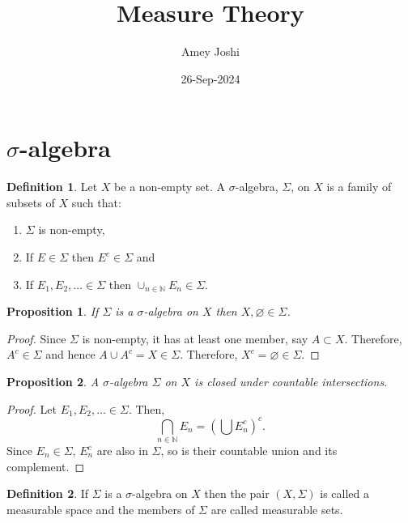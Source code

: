 \documentclass{article}
\title{Measure Theory}
\author{Amey Joshi}
\date{26-Sep-2024}
\theoremstyle{plain}
\numberwithin{thm}{section}
\theoremstyle{plain}
\newtheorem{prop}{Proposition}
\numberwithin{prop}{section}
\theoremstyle{definition}
\newtheorem{defn}{Definition}
\numberwithin{defn}{section}
\theoremstyle{remark}
\theoremstyle{plain}
\numberwithin{cor}{section}
\numberwithin{equation}{section}
\begin{document}
\maketitle
\section{$\sigma$-algebra}\label{s1}
\begin{defn}\label{s1d1}
Let $X$ be a non-empty set. A $\sigma$-algebra, $\Sigma$, on $X$ is a family
of subsets of $X$ such that:
\begin{enumerate}
\item $\Sigma$ is non-empty,
\item If $E \in \Sigma$ then $E^c \in \Sigma$ and
\item If $E_1, E_2, \ldots \in \Sigma$ then $\cup_{n \in \mathbb{N}}E_n \in \Sigma$. 
\end{enumerate}
\end{defn}
\begin{prop}\label{s1p1}
If $\Sigma$ is a $\sigma$-algebra on $X$ then $X, \varnothing \in \Sigma$.
\end{prop}
\begin{proof}
Since $\Sigma$ is non-empty, it has at least one member, say $A \subset X$. 
Therefore, $A^c \in \Sigma$ and hence $A \cup A^c = X \in \Sigma$. 
Therefore, $X^c = \varnothing \in \Sigma$.
\end{proof}

\begin{prop}\label{s1p2}
A $\sigma$-algebra $\Sigma$ on $X$ is closed under countable intersections.
\end{prop}
\begin{proof}
Let $E_1, E_2, \ldots \in \Sigma$. Then,
\[
\bigcap_{n \in \mathbb{N}}E_n = \left(\bigcup E_n^c\right)^c.
\]
Since $E_n \in \Sigma$, $E_n^c$ are also in $\Sigma$, so is their
countable union and its complement.
\end{proof}

\begin{defn}\label{s1d2}
If $\Sigma$ is a $\sigma$-algebra on $X$ then the pair $(X, \Sigma)$
is called a measurable space and the members of $\Sigma$ are called measurable
sets.
\end{defn}
\end{document}
